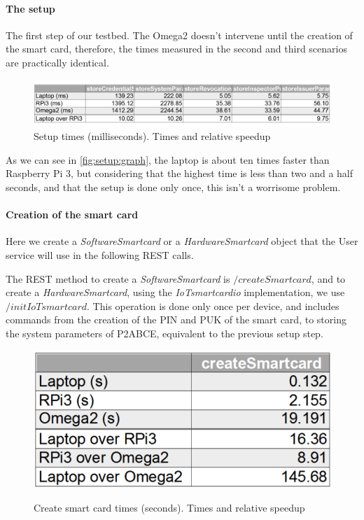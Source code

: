 \documentclass[journal]{IEEEtran}
\begin{document}
\paragraph{The setup}\hfil

The first step of our testbed. The Omega2 doesn't intervene until the creation of the smart card, therefore, the times measured in the second and third scenarios are practically identical.

\begin{figure}[bth]
	\includegraphics[width=\linewidth]{gfx/graphics/setuptable}
	\caption{Setup times (milliseconds). Times and relative speedup}
	\label{fig:setup:graph}
\end{figure}


As we can see in \autoref{fig:setup:graph}, the laptop is about ten times faster than Raspberry Pi 3, but considering that the highest time is less than two and a half seconds, and that the setup is done only once, this isn't a worrisome problem.

\paragraph{Creation of the smart card}\hfil

Here we create a \textit{SoftwareSmartcard} or a \textit{HardwareSmartcard} object that the User service will use in the following REST calls.

The REST method to create a \textit{SoftwareSmartcard} is $/createSmartcard$, and to create a \textit{HardwareSmartcard}, using the \textit{IoTsmartcardio} implementation, we use $/initIoTsmartcard$. This operation is done only once per device, and includes commands from the creation of the PIN and PUK of the smart card, to storing the system parameters of P2ABCE, equivalent to the previous setup step.


\begin{figure}[bth]
	\caption{Create smart card times (seconds). Times and relative speedup}
	\includegraphics[width=0.7\linewidth]{gfx/graphics/createSCtable}
	\label{fig:createSmartCard:graph}
\end{figure}
\end{document}
